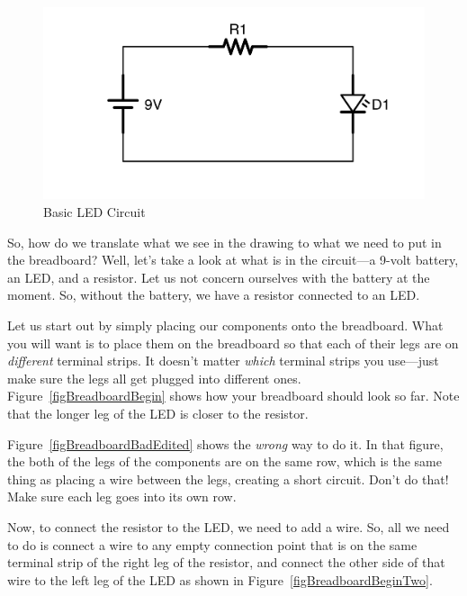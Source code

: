 \begin{figure}
\caption{Basic LED Circuit}
\label{figCircuitBasicLEDRepeat}
\centering
\includegraphics[scale=0.125]{CircuitBasicLED.png}
\end{figure}

So, how do we translate what we see in the drawing to what we need to put in the breadboard?
Well, let's take a look at what is in the circuit---a 9-volt battery, an LED, and a resistor.
Let us not concern ourselves with the battery at the moment.
So, without the battery, we have a resistor connected to an LED.

Let us start out by simply placing our components onto the breadboard.
What you will want is to place them on the breadboard so that each of their legs are on \emph{different} terminal strips.
It doesn't matter \emph{which} terminal strips you use---just make sure the legs all get plugged into different ones.
Figure~\ref{figBreadboardBegin} shows how your breadboard should look so far.
Note that the longer leg of the LED is closer to the resistor.

Figure~\ref{figBreadboardBadEdited} shows the \emph{wrong} way to do it.
In that figure, the both of the legs of the components are on the same row, which is the same thing as placing a wire between the legs, creating a short circuit.
Don't do that!  Make sure each leg goes into its own row.



Now, to connect the resistor to the LED, we need to add a wire.
So, all we need to do is connect a wire to any empty connection point that is on the same terminal strip of the right leg of the resistor, and connect the other side of that wire to the left leg of the LED as shown in Figure~\ref{figBreadboardBeginTwo}.

